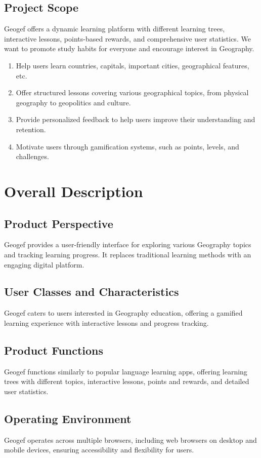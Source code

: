 \documentclass{scrreprt}
\begin{document}
\section{Project Scope}
Geogef offers a dynamic learning platform with different learning trees, interactive lessons, points-based rewards, and comprehensive user statistics. We want to promote study habits for everyone and encourage interest in Geography.
\begin{enumerate}
    \item Help users learn countries, capitals, important cities, geographical features, etc.
    \item Offer structured lessons covering various geographical topics, from physical geography to geopolitics and culture.
    \item Provide personalized feedback to help users improve their understanding and retention.
    \item Motivate users through gamification systems, such as points, levels, and challenges.
\end{enumerate}

\chapter{Overall Description}

\section{Product Perspective}
Geogef provides a user-friendly interface for exploring various Geography topics and tracking learning progress. It replaces traditional learning methods with an engaging digital platform.

\section{User Classes and Characteristics}
Geogef caters to users interested in Geography education, offering a gamified learning experience with interactive lessons and progress tracking.

\section{Product Functions}
Geogef functions similarly to popular language learning apps, offering learning trees with different topics, interactive lessons, points and rewards, and detailed user statistics.

\section{Operating Environment}
Geogef operates across multiple browsers, including web browsers on desktop and mobile devices, ensuring accessibility and flexibility for users.
\end{document}
